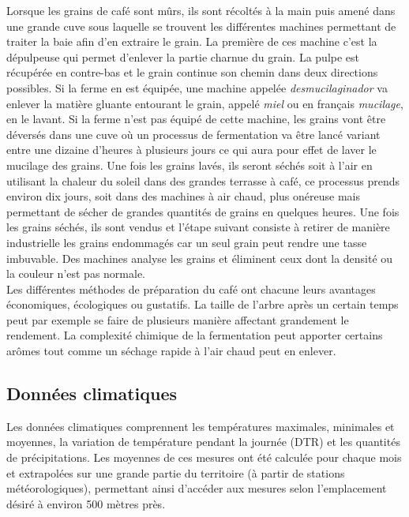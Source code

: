 \noindent Lorsque les grains de café sont mûrs, ils sont récoltés à la main puis amené dans une grande cuve sous laquelle se trouvent les différentes machines permettant de traiter la baie afin d'en extraire le grain. La première de ces machine c'est la dépulpeuse qui permet d'enlever la partie charnue du grain. La pulpe est récupérée en contre-bas et le grain continue son chemin dans deux directions possibles. Si la ferme en est équipée, une machine appelée \textit{desmucilaginador} va enlever la matière gluante entourant le grain, appelé \textit{miel} ou en français \textit{mucilage}, en le lavant. Si la ferme n'est pas équipé de cette machine, les grains vont être déversés dans une cuve où un processus de fermentation va être lancé variant entre une dizaine d'heures à plusieurs jours ce qui aura pour effet de laver le mucilage des grains. Une fois les grains lavés, ils seront séchés soit à l'air en utilisant la chaleur du soleil dans des grandes terrasse à café, ce processus prends environ dix jours, soit dans des machines à air chaud, plus onéreuse mais permettant de sécher de grandes quantités de grains en quelques heures. Une fois les grains séchés, ils sont vendus et l'étape suivant consiste à retirer de manière industrielle les grains endommagés car un seul grain peut rendre une tasse imbuvable. Des machines analyse les grains et éliminent ceux dont la densité ou la couleur n'est pas normale.\cite{GuideCafe} \\

\noindent Les différentes méthodes de préparation du café ont chacune leurs avantages économiques, écologiques ou gustatifs. La taille de l'arbre après un certain temps peut par exemple se faire de plusieurs manière affectant grandement le rendement. La complexité chimique de la fermentation peut apporter certains arômes tout comme un séchage rapide à l'air chaud peut en enlever. 

 
\subsection{Données climatiques}
Les données climatiques comprennent les températures maximales, minimales et moyennes, la variation de température pendant la journée (DTR) et les quantités de précipitations. Les moyennes de ces mesures ont été calculée pour chaque mois et extrapolées sur une grande partie du territoire (à partir de stations météorologiques), permettant ainsi d’accéder aux mesures selon l’emplacement désiré à environ 500 mètres près. \\

